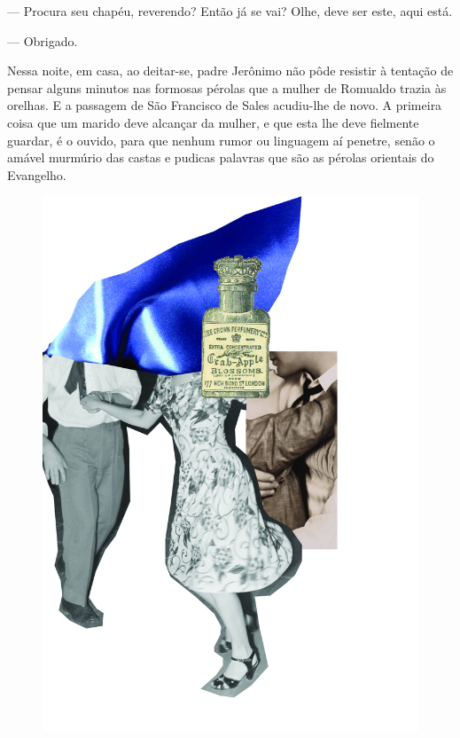 --- Procura seu chapéu, reverendo? Então já se vai? Olhe, deve ser este,
aqui está.

--- Obrigado.

Nessa noite, em casa, ao deitar-se, padre Jerônimo não pôde resistir à
tentação de pensar alguns minutos nas formosas pérolas que a mulher de
Romualdo trazia às orelhas. E a passagem de São Francisco de Sales
acudiu-lhe de novo. A primeira coisa que um marido deve alcançar da
mulher, e que esta lhe deve fielmente guardar, é o ouvido, para que
nenhum rumor ou linguagem aí penetre, senão o amável murmúrio das castas
e pudicas palavras que são as pérolas orientais do Evangelho.

\pagebreak
\thispagestyle{empty}
\begin{figure}
\vspace*{-.5cm}
\hspace*{-2.3cm}\includegraphics[width=140mm]{../ilustracoes/12_UTIL.jpg}
\end{figure}
\pagebreak


